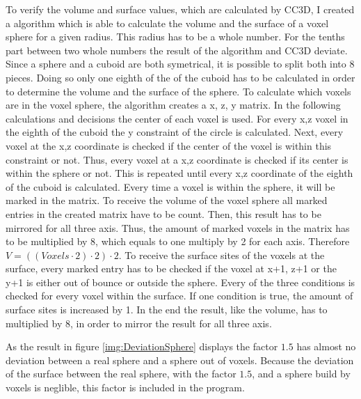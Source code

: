 To verify the volume and surface values, which are calculated by \ac{CC3D}, I created a algorithm which is able to calculate the volume and the surface of a voxel sphere for a given radius. This radius has to be a whole number. For the tenths part between two whole numbers the result of the algorithm and \ac{CC3D} deviate.
Since a sphere and a cuboid are both symetrical, it is possible to split both into 8 pieces. Doing so only one eighth of the of the cuboid has to be calculated in order to determine the volume and the surface of the sphere. \newline
To calculate which voxels are in the voxel sphere, the algorithm creates a x, z, y matrix. In the following calculations and decisions the center of each voxel is used. For every x,z voxel in the eighth of the cuboid the y constraint of the circle is calculated. Next, every voxel at the x,z coordinate is checked if the center of the voxel is within this constraint or not. Thus, every voxel at a x,z coordinate is checked if its center is within the sphere or not. This is repeated until every x,z coordinate of the eighth of the cuboid is calculated. Every time a voxel is within the sphere, it will be marked in the matrix.  \newline
To receive the volume of the voxel sphere all marked entries in the created matrix have to be count. Then, this result has to be mirrored for all three axis. Thus, the amount of marked voxels in the matrix has to be multiplied by 8, which equals to one multiply by 2 for each axis. Therefore $V=((Voxels \cdot 2) \cdot 2) \cdot 2$.
To receive the surface sites of the voxels at the surface, every marked entry has to be checked if the voxel at x+1, z+1 or the y+1 is either out of bounce or outside the sphere. Every of the three conditions is checked for every voxel within the surface. If one condition is true, the amount of surface sites is increased by 1. In the end the result, like the volume, has to multiplied by 8, in order to mirror the result for all three axis.


As the result in figure \ref{img:DeviationSphere} displays the factor $1.5$ has almost no deviation between a real sphere and a sphere out of voxels. Because the deviation of the surface between the real sphere, with the factor $1.5$, and a sphere build by voxels is neglible, this factor is included in the program.